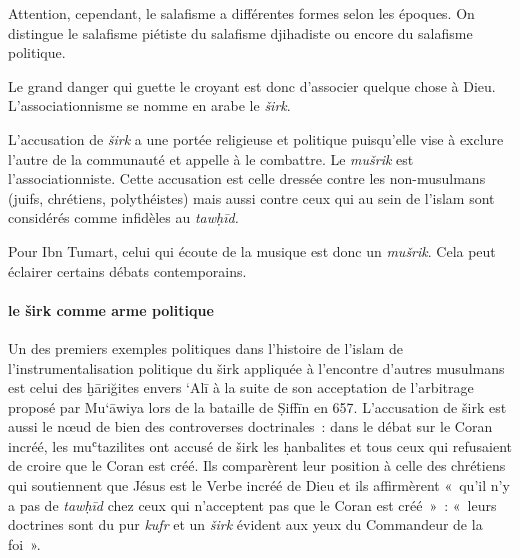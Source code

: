 Attention, cependant, le salafisme a différentes formes selon les
époques. On distingue le salafisme piétiste du salafisme djihadiste ou
encore du salafisme politique.


\begin{Def}[širk]
Le grand danger qui guette le croyant est donc d'associer quelque chose
à Dieu. L'associationnisme se nomme en arabe le \emph{širk}.
\end{Def}

L'accusation de \emph{širk} a une portée religieuse et politique
puisqu'elle vise à exclure l'autre de la communauté et appelle à le
combattre. Le \emph{mušrik} est l'associationniste. Cette accusation est
celle dressée contre les non-musulmans (juifs, chrétiens, polythéistes)
mais aussi contre ceux qui au sein de l'islam sont considérés comme
infidèles au \emph{tawḥīd.}


Pour Ibn Tumart, celui qui écoute de la musique est donc un
\emph{mušrik}. Cela peut éclairer certains débats contemporains.

\paragraph{le širk comme arme politique}

Un des premiers exemples politiques dans l'histoire de l'islam de
l'instrumentalisation politique du širk appliquée à l'encontre d'autres
musulmans est celui des ḫāriğites envers `Alī à la suite de son
acceptation de l'arbitrage proposé par Mu`āwiya lors de la bataille de
Ṣiffīn en 657.
L'accusation de širk est aussi le nœud de bien des controverses
doctrinales~: dans le débat sur le Coran incréé, les muʿtazilites ont
accusé de širk les ḥanbalites et tous ceux qui refusaient de croire que
le Coran est créé. Ils comparèrent leur position à celle des chrétiens
qui soutiennent que Jésus est le Verbe incréé de Dieu et ils affirmèrent 
«~qu'il n'y a pas de \textit{tawḥīd} chez ceux qui n'acceptent pas que le Coran
est créé~»~: «~leurs doctrines sont du pur \textit{kufr} et un \textit{širk} évident aux
yeux du Commandeur de la foi~». 
  
